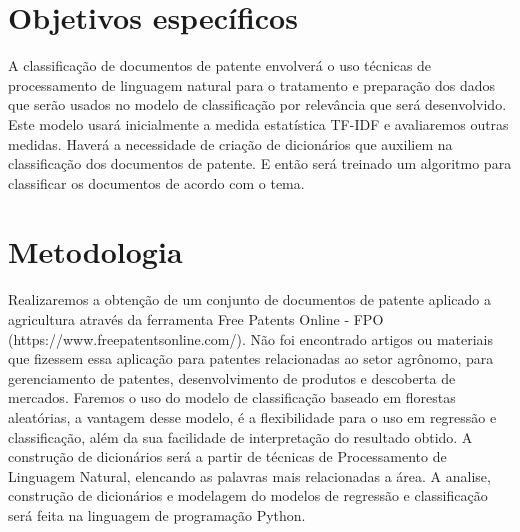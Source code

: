 \section{Objetivos específicos}
A classificação de documentos de patente envolverá o uso técnicas de processamento de linguagem natural para o tratamento e preparação dos dados que serão usados no modelo de classificação por relevância que será desenvolvido. Este modelo usará inicialmente a medida estatística TF-IDF e avaliaremos outras medidas. Haverá a necessidade de criação de dicionários que auxiliem na classificação dos documentos de patente. E então será treinado um algoritmo para classificar os documentos de acordo com o tema. 

\section{Metodologia}
Realizaremos a obtenção de um conjunto de documentos de patente aplicado a agricultura através da ferramenta Free Patents Online - FPO (https://www.freepatentsonline.com/). Não foi encontrado artigos ou materiais que fizessem essa aplicação para patentes relacionadas ao setor agrônomo, para gerenciamento de patentes, desenvolvimento de produtos e descoberta de mercados. 
Faremos o uso do modelo de classificação baseado em florestas aleatórias, a vantagem desse modelo, é a flexibilidade para o uso em regressão e classificação, além da sua facilidade de interpretação do resultado obtido.  
A construção de dicionários será a partir de técnicas de Processamento de Linguagem Natural, elencando as palavras mais relacionadas a área. A analise, construção de dicionários e modelagem do modelos de regressão e classificação será feita na linguagem de programação Python.
